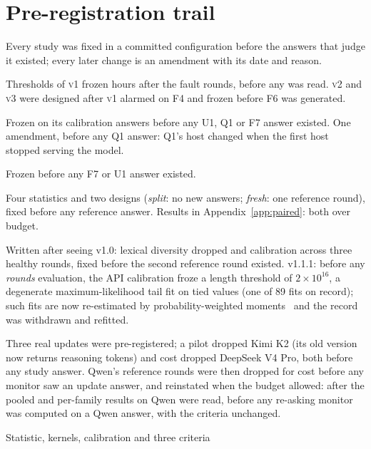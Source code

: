 \documentclass{article}
\newcommand{\vone}{\textsc{v1}}
\newcommand{\vtwo}{\textsc{v2}}
\newcommand{\vthree}{\textsc{v3}}
\begin{document}
\section{Pre-registration trail}
\label{app:prereg}

Every study was fixed in a committed configuration before the answers that judge
it existed; every later change is an amendment with its date and reason.

\begin{description}[leftmargin=0pt,itemsep=2pt,font=\normalfont\itshape]
  \item[Local study.] Thresholds of \vone{} frozen hours after the fault rounds,
  before any was read. \vtwo{} and \vthree{} were designed after \vone{} alarmed on
  F4 and frozen before F6 was generated.
  \item[Hosted DeepSeek study.] Frozen on its calibration answers before any
  U1, Q1 or F7 answer existed. One amendment, before any Q1 answer: Q1's host
  changed when the first host stopped serving the model.
  \item[Real traffic.] Frozen before any F7 or U1 answer existed.
  \item[Paired monitor v1.0.] Four statistics and two designs (\emph{split}: no new
  answers; \emph{fresh}: one reference round), fixed before any reference answer.
  Results in Appendix~\ref{app:paired}: both over budget.
  \item[v1.1, \emph{rounds}.] Written after seeing v1.0: lexical diversity dropped
  and calibration across three healthy rounds, fixed before the second reference
  round existed. v1.1.1: before any \emph{rounds} evaluation, the API calibration
  froze a length threshold of $2\times10^{16}$, a degenerate maximum-likelihood tail
  fit on tied values (one of 89 fits on record); such fits are now re-estimated by
  probability-weighted moments~\citep{hosking1987pwm} and the record was withdrawn
  and refitted.
  \item[Update replication.] Three real updates were pre-registered; a pilot
  dropped Kimi K2 (its old version now returns reasoning tokens) and cost dropped
  DeepSeek V4 Pro, both before any study answer. Qwen's reference rounds were
  then dropped for cost before any monitor saw an update answer, and reinstated
  when the budget allowed: after the pooled and per-family results on Qwen were
  read, before any re-asking monitor was computed on a Qwen answer, with the
  criteria unchanged.
  \item[Served-answer test.] Statistic, kernels, calibration and three criteria

\end{description}
\end{document}
